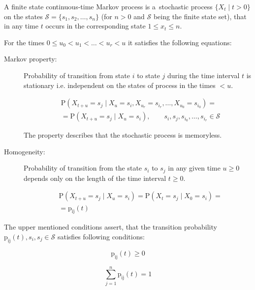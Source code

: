 \documentclass[thesis=M,english]{FITthesis}[2012/10/20]
\begin{document}
A finite state continuous-time Markov process is a~stochastic process $\{ X_t \mid t > 0\}$ on the states $\mathcal{S} = \{ s_1, s_2, \dots, s_n \}$  (for $n>0$ and $\mathcal{S}$ being the finite state set), that in any time $t$  occurs in the corresponding state $1 \leq x_t \leq n$. 

For the times $0 \leq u_0 < u_1 < \dots < u_r < u$ it satisfies the following equations: 
\begin{description}
\item [Markov property:] Probability of transition from state $i$ to state $j$ during the time interval $t$ is stationary i.e. independent on the states of process in the times $< u$.  
    
\begin{equation}
\begin{aligned}
& \mathrm{P}( X_{t+u} = s_j \mid X_u = s_i, X_{u_r} = s_{i_r}, \dots , X_{u_0} = s_{i_0} ) = \\ 
& = \mathrm{P}( X_{t+u} = s_j \mid X_u = s_i ), \qquad s_i,s_j,s_{i_0}, \dots ,s_{i_r} \in \mathcal{S} 
\end{aligned}
\end{equation}

The property describes that the stochastic process is memoryless.

\item [Homogeneity:] Probability of transition from the state $s_i$ to $s_j$ in any given time $u \geq 0$ depends only on the length of the time interval $t \geq 0$. 

\begin{equation}
\begin{aligned}
& \mathrm{P}( X_{t+u} = s_j \mid X_u = s_i ) = \mathrm{P}( X_t = s_j \mid X_0 = s_i ) = \\
& = \mathrm{p_{ij}}(t)
\end{aligned}
\end{equation}

\end{description}
 

The upper mentioned conditions assert, that the transition probability $\mathrm{p_{ij}}(t), s_i,s_j \in \mathcal{S}$ satisfies following conditions:%


\begin{equation}
\mathrm{p_{ij}}(t) \geq 0
\end{equation}

\begin{equation}
\sum_{j = 1}^n \mathrm{p_{ij}}(t) = 1
\end{equation}
\end{document}
